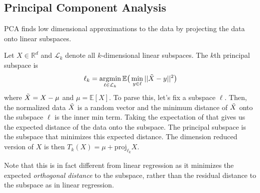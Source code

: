 \documentclass{article}
\DeclareMathOperator*{\argmin}{\arg\!\min}
\begin{document}
  \subsection{Principal Component Analysis} 
    
    PCA finds low dimensional approximations to the data by projecting the data onto linear subspaces. 

    \begin{definition}
      Let $X \in \mathbb{R}^d$ and $\mathcal{L}_k$ denote all $k$-dimensional linear subspaces. The $k$th principal subspace is 
      \begin{equation}
        \ell_k = \argmin_{\ell \in \mathcal{L}_k} \mathbb{E} \big( \min_{y \in \ell} ||\Tilde{X} - y||^2 \big)
      \end{equation}
      where $\Tilde{X} = X - \mu$ and $\mu = \mathbb{E}[X]$. To parse this, let's fix a subspace $\ell$. Then, the normalized data $\Tilde{X}$ is a random vector and the minimum distance of $\Tilde{X}$ onto the subspace $\ell$ is the inner min term. Taking the expectation of that gives us the expected distance of the data onto the subspace. The principal subspace is the subspace that minimizes this expected distance. The dimension reduced version of $X$ is then $T_k (X) = \mu + \mathrm{proj}_{\ell_k} X$. 
    \end{definition}

    Note that this is in fact different from linear regression as it minimizes the expected \textit{orthogonal distance} to the subspace, rather than the residual distance to the subspace as in linear regression. 
\end{document}
